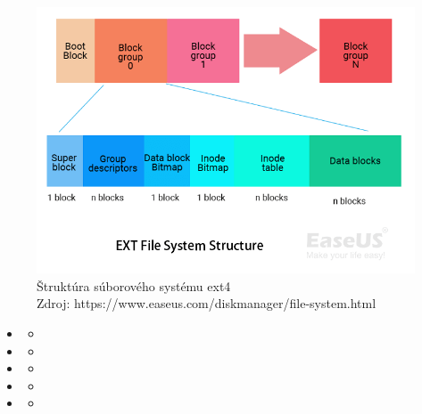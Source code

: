\documentclass[12pt,oneside,slovak,a4paper]{article}
\begin{document}
\begin{figure}[H]
	\centering
	\captionsetup{justification=centering,margin=2cm}
	\includegraphics[width=\linewidth]{./images/ext-file-system-structure.png}
	\centering
	\caption{Štruktúra súborového systému ext4 \\ Zdroj: https://www.easeus.com/diskmanager/file-system.html}
\end{figure}

\begin{spacing}{1.0}
\begin{itemize}
	\item 
		\begin{itemize}
			\item 
		\end{itemize}
	\item 
		\begin{itemize}
			\item 
		\end{itemize}
	\item 
		\begin{itemize}
			\item 
		\end{itemize}
	\item 
		\begin{itemize}
			\item 
		\end{itemize}
	\item 
		\begin{itemize}
			\item 
		\end{itemize}
\end{itemize}
\end{spacing}
\end{document}
